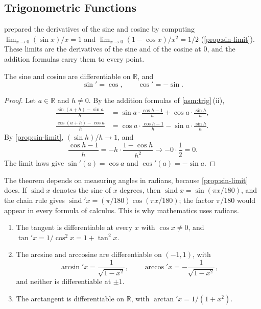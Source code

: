 \subsection{Trigonometric Functions}

 prepared the derivatives of the sine and cosine by computing $\lim_{x\to0}(\sin x)/x=1$ and $\lim_{x\to0}(1-\cos x)/x^2=1/2$ (\cref{prop:sin-limit}). These limits are the derivatives of the sine and of the cosine at $0$, and the addition formulas carry them to every point.

\begin{theorem}
\label{thm:trig-derivatives}
The sine and cosine are differentiable on $\mathbb R$, and
\[
\sin'=\cos,\qquad\cos'=-\sin .
\]
\end{theorem}

\begin{proof}
Let $a\in\mathbb R$ and $h\ne0$. By the addition formulas of \cref{asm:trig}\,(ii),
\begin{align*}
\frac{\sin(a+h)-\sin a}h&=\sin a\cdot\frac{\cos h-1}h+\cos a\cdot\frac{\sin h}h,\\
\frac{\cos(a+h)-\cos a}h&=\cos a\cdot\frac{\cos h-1}h-\sin a\cdot\frac{\sin h}h.
\end{align*}
By \cref{prop:sin-limit}, $(\sin h)/h\to1$, and
\[
\frac{\cos h-1}h=-h\cdot\frac{1-\cos h}{h^2}\to-0\cdot\frac12=0 .
\]
The limit laws give $\sin'(a)=\cos a$ and $\cos'(a)=-\sin a$.
\end{proof}

The theorem depends on measuring angles in radians, because \cref{prop:sin-limit} does. If $\operatorname{sind}x$ denotes the sine of $x$ degrees, then $\operatorname{sind}x=\sin(\pi x/180)$, and the chain rule gives $\operatorname{sind}'x=(\pi/180)\cos(\pi x/180)$; the factor $\pi/180$ would appear in every formula of calculus. This is why mathematics uses radians.

\begin{corollary}
\label{cor:inverse-trig-derivatives}
\leavevmode
\begin{enumerate}
\item The tangent is differentiable at every $x$ with $\cos x\ne0$, and $\tan'x=1/\cos^2x=1+\tan^2x$.
\item The arcsine and arccosine are differentiable on $(-1,1)$, with
\[
\arcsin'x=\frac1{\sqrt{1-x^2}},\qquad\arccos'x=-\frac1{\sqrt{1-x^2}},
\]
and neither is differentiable at $\pm1$.
\item The arctangent is differentiable on $\mathbb R$, with $\arctan'x=1/(1+x^2)$.
\end{enumerate}
\end{corollary}


